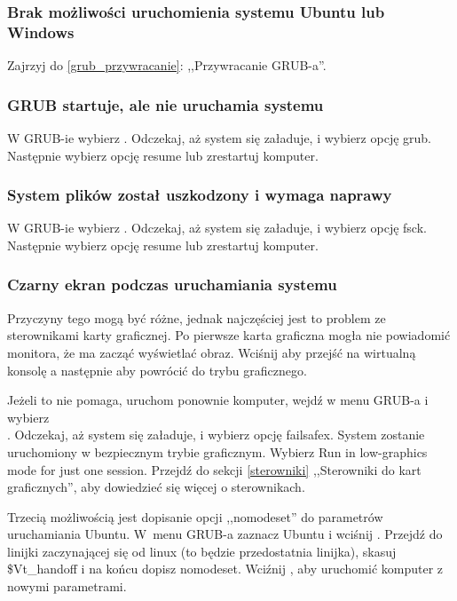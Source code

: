 \label{rozwiązywanie problemów}
\subsubsection{Brak możliwości uruchomienia systemu Ubuntu lub Windows}
Zajrzyj do \ref{grub_przywracanie}: ,,Przywracanie GRUB-a''.

\subsubsection{GRUB startuje, ale nie uruchamia systemu}
W GRUB-ie wybierz . Odczekaj, aż system się załaduje, i wybierz opcję \textcolor{ubuntu_orange}{grub}. Następnie wybierz opcję \textcolor{ubuntu_orange}{resume} lub zrestartuj komputer.

\subsubsection{System plików został uszkodzony i wymaga naprawy}
W GRUB-ie wybierz . Odczekaj, aż system się załaduje, i wybierz opcję \textcolor{ubuntu_orange}{fsck}. Następnie wybierz opcję \textcolor{ubuntu_orange}{resume} lub zrestartuj komputer.

\subsubsection{Czarny ekran podczas uruchamiania systemu}
Przyczyny tego mogą być różne, jednak najczęściej jest to problem ze sterownikami karty graficznej. Po pierwsze karta graficzna mogła nie powiadomić monitora, że ma zacząć wyświetlać obraz. Wciśnij  aby przejść na wirtualną konsolę a następnie  aby powrócić do trybu graficznego.

Jeżeli to nie pomaga, uruchom ponownie komputer, wejdź w menu GRUB-a i wybierz\\
. Odczekaj, aż system się załaduje, i wybierz opcję \textcolor{ubuntu_orange}{failsafex}. System zostanie uruchomiony w bezpiecznym trybie graficznym. Wybierz \textcolor{ubuntu_orange}{Run in low-graphics mode for just one session}. Przejdź do sekcji \ref{sterowniki} ,,Sterowniki do kart graficznych'', aby dowiedzieć się więcej o sterownikach.

Trzecią możliwością jest dopisanie opcji ,,nomodeset'' do parametrów uruchamiania Ubuntu. W~menu GRUB-a zaznacz Ubuntu i wciśnij . Przejdź do linijki zaczynającej się od \textcolor{ubuntu_orange}{linux}	(to będzie przedostatnia linijka), skasuj \$Vt\_handoff i na końcu dopisz \textcolor{ubuntu_orange}{nomodeset}. Wciźnij , aby uruchomić komputer z nowymi parametrami.


